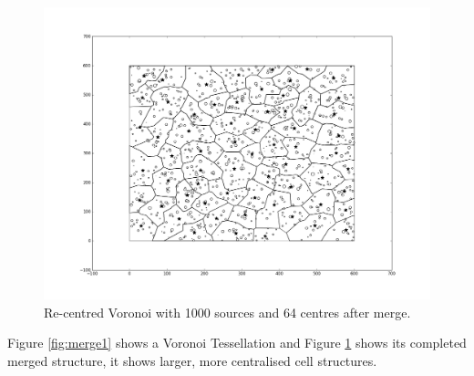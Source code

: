 \begin{figure}[H]
\centering
  \includegraphics[width=\linewidth]{Images/merge2.png}
  \caption{Re-centred Voronoi with 1000 sources and 64 centres after merge.}
  \label{fig:merge2}
\end{figure}
Figure \ref{fig:merge1} shows a Voronoi Tessellation and Figure \ref{fig:merge2} shows its completed merged structure, it shows larger, more centralised cell structures.